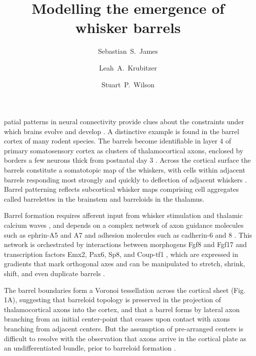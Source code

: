 \documentclass[9pt,twocolumn,twoside,lineno]{pnas-new}
\title{Modelling the emergence of whisker barrels}
\author[a,1]{Sebastian~S.~James}
\author[b]{Leah~A.~Krubitzer}
\author[a]{Stuart~P.~Wilson}
\affil[a]{Department of Psychology, The University of Sheffield, Sheffield, United Kingdom.}
\affil[b]{Center for Neuroscience, The University of California, Davis, United States.}
\begin{document}
\newcommand{\cmnt}[1]{\textcolor{blue}{#1}}
\newcommand{\dvrg}{\nabla\vcdot\nabla}
\newcommand{\e}{\emph}
\newcommand{\bol}{\textbf}
\newcommand{\mb}[1]{\mathbf{#1}}
\makeatletter
\newcommand*\vcdot{\mathpalette\vcdot@{.35}}
\newcommand*\vcdot@[2]{\mathbin{\vcenter{\hbox{\scalebox{#2}{$\m@th#1\bullet$}}}}}
\makeatother

\maketitle
\thispagestyle{firststyle}

\modulolinenumbers{}
\linenumbers

patial patterns in neural connectivity provide clues about the
constraints under which brains evolve and develop
\citep{purves_iterated_1992}. A distinctive example is found in the barrel
cortex of many rodent species. The barrels become identifiable in layer 4 of
primary somatosensory cortex as clusters of thalamocortical axons, enclosed by
borders a few neurons thick from postnatal day 3
\citep{erzurumlu_development_2012}. Across the cortical surface the barrels
constitute a somatotopic map of the whiskers, with cells within adjacent
barrels responding most strongly and quickly to deflection of adjacent
whiskers \citep{armstrong-james_flow_1992}. Barrel patterning reflects
subcortical whisker maps comprising cell aggregates called barrelettes in the
brainstem and barreloids in the thalamus.

Barrel formation requires afferent input from whisker stimulation and thalamic
calcium waves \citep{anton-bolanos_prenatal_2019}, and depends on a complex
network of axon guidance molecules such as ephrin-A5 and A7 and adhesion
molecules such as cadherin-6 and 8 \citep{miller_epha7-ephrin-a5_2006}.  This
network is orchestrated by interactions between morphogens Fgf8 and Fgf17 and
transcription factors Emx2, Pax6, Sp8, and Coup-tf1
\citep{shimogori_fibroblast_2005}, which are expressed in gradients that mark
orthogonal axes and can be manipulated to stretch, shrink, shift, and even
duplicate barrels \cite{assimacopoulos_fibroblast_2012}.

The barrel boundaries form a Voronoi tessellation across the cortical sheet
\citep{senft_mouse_1991} (Fig.\,1A), suggesting that barreloid topology is
preserved in the projection of thalamocortical axons into the cortex, and that
a barrel forms by lateral axon branching from an initial center-point that
ceases upon contact with axons branching from adjacent centers. But the
assumption of pre-arranged centers is difficult to resolve with the
observation that axons arrive in the cortical plate as an undifferentiated
bundle, prior to barreloid formation \cite{agmon_organized_1993}.
\end{document}
